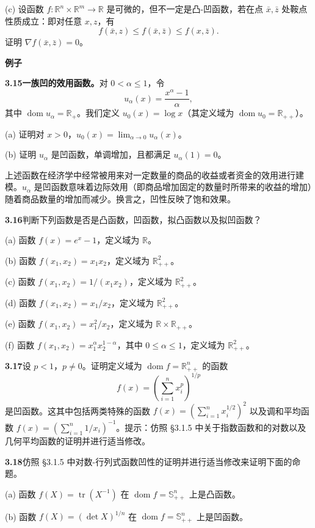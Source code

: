 \documentclass[UTF8, 12pt, fontset=fandol, oneside]{ctexart}
\DeclareMathOperator{\dom}{dom}
\begin{document}
(c) 设函数 $f:\mathbb{R}^n\times\mathbb{R}^m\to\mathbb{R}$ 是可微的，但不一定是凸-凹函数，若在点 $\bar x,\bar z$ 处鞍点性质成立：即对任意 $x,z$，有
\[
f(\bar x,z)\leq f(\bar x,\bar z)\leq f(x,\bar z).
\]
证明 $\nabla f(\bar x,\bar z)=0$。

\noindent\textbf{例子}

\noindent\textbf{3.15\quad 一族凹的效用函数。}\quad 对 $0<\alpha\leq1$，令
\[
u_\alpha(x)=\frac{x^\alpha-1}{\alpha},
\]
其中 $\dom u_\alpha=\mathbb{R}_+$。我们定义 $u_0(x)=\log x$（其定义域为 $\dom u_0=\mathbb{R}_{++}$）。

(a) 证明对 $x>0$，$u_0(x)=\lim_{\alpha\to0}u_\alpha(x)$。

(b) 证明 $u_\alpha$ 是凹函数，单调增加，且都满足 $u_\alpha(1)=0$。

上述函数在经济学中经常被用来对一定数量的商品的收益或者资金的效用进行建模。$u_\alpha$ 是凹函数意味着边际效用（即商品增加固定的数量时所带来的收益的增加）随着商品数量的增加而减少。换言之，凹性反映了饱和效果。

\noindent\textbf{3.16}\quad 判断下列函数是否是凸函数，凹函数，拟凸函数以及拟凹函数？

(a) 函数 $f(x)=e^x-1$，定义域为 $\mathbb{R}$。

(b) 函数 $f(x_1,x_2)=x_1x_2$，定义域为 $\mathbb{R}_{++}^2$。

(c) 函数 $f(x_1,x_2)=1/(x_1x_2)$，定义域为 $\mathbb{R}_{++}^2$。

(d) 函数 $f(x_1,x_2)=x_1/x_2$，定义域为 $\mathbb{R}_{++}^2$。

(e) 函数 $f(x_1,x_2)=x_1^2/x_2$，定义域为 $\mathbb{R}\times\mathbb{R}_{++}$。

(f) 函数 $f(x_1,x_2)=x_1^\alpha x_2^{1-\alpha}$，其中 $0\leq\alpha\leq1$，定义域为 $\mathbb{R}_{++}^2$。

\noindent\textbf{3.17}\quad 设 $p<1$，$p\neq0$。证明定义域为 $\dom f=\mathbb{R}_{++}^n$ 的函数
\[
f(x)=\left(\sum_{i=1}^n x_i^p\right)^{1/p}
\]
是凹函数。这其中包括两类特殊的函数 $f(x)=\left(\sum_{i=1}^n x_i^{1/2}\right)^2$ 以及调和平均函数 $f(x)=\left(\sum_{i=1}^n 1/x_i\right)^{-1}$。提示：仿照 \S3.1.5 中关于指数函数和的对数以及几何平均函数的证明并进行适当修改。

\noindent\textbf{3.18}\quad 仿照 \S3.1.5 中对数-行列式函数凹性的证明并进行适当修改来证明下面的命题。

(a) 函数 $f(X)=\operatorname{tr}(X^{-1})$ 在 $\dom f=\mathbb{S}_{++}^n$ 上是凸函数。

(b) 函数 $f(X)=(\det X)^{1/n}$ 在 $\dom f=\mathbb{S}_{++}^n$ 上是凹函数。
\end{document}
